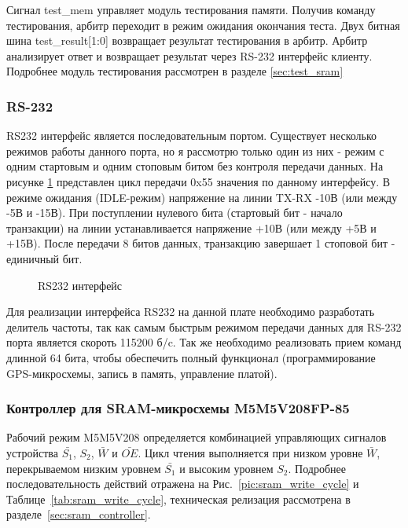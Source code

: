 Сигнал test\_mem управляет модуль тестирования памяти. Получив команду тестирования, арбитр переходит в режим ожидания окончания теста.
Двух битная шина test\_result[1:0] возвращает результат тестирования в арбитр. Арбитр анализирует ответ и возвращает результат 
через RS-232 интерфейс клиенту. Подробнее модуль тестирования рассмотрен в разделе \ref{sec:test_sram}

\subsubsection*{RS-232}
\label{sec:rs232}
RS232 интерфейс является последовательным портом. Существует несколько режимов работы данного порта, но я рассмотрю только один
из них - режим с одним стартовым и одним стоповым битом без контроля передачи данных. На рисунке \ref{pic:rs232_wire} представлен
цикл передачи 0x55 значения по данному интерфейсу. В режиме ожидания (IDLE-режим) напряжение на линии TX-RX -10В (или между -5В и -15В).
При поступлении нулевого бита (стартовый бит - начало транзакции) на линии устанавливается напряжение +10В (или между +5В и +15В).
После передачи 8 битов данных, транзакцию завершает 1 стоповой бит - единичный бит.

\begin{figure}[H]
\caption{RS232 интерфейс}
\label{pic:rs232_wire}
\end{figure}

Для реализации интерфейса RS232 на данной плате необходимо разработать делитель частоты, так как самым быстрым режимом передачи данных
для RS-232 порта является скороть 115200 б/c. Так же необходимо реализовать прием команд длинной 64 бита, чтобы обеспечить
полный функционал (программирование GPS-микросхемы, запись в память, управление платой).

\subsubsection*{Контроллер для SRAM-микросхемы M5M5V208FP-85}
\label{sec:sram_controller}
Рабочий режим M5M5V208 определяется комбинацией управляющих сигналов устройства $\bar{S_1}$, ${S_2}$, $\bar{W}$ и $\bar{OE}$.
Цикл чтения выполняется при низком уровне $\bar{W}$, перекрываемом низким уровнем $\bar{S_1}$ и высоким уровнем ${S_2}$.
Подробнее последовательность действий отражена на Рис.~\ref{pic:sram_write_cycle} и Таблице~\ref{tab:sram_write_cycle},
техническая релизация рассмотрена в разделе~\ref{sec:sram_controller}.

